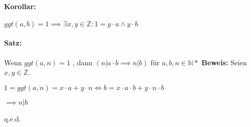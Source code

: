 \documentclass[12pt]{scrreprt}
\newcommand{\corollary}[1]{\paragraph{Korollar:} #1\newline}
\newcommand{\theorem}[1]{\paragraph{Satz:} #1\newline}
\newenvironment{proof}
    {\textbf{Beweis:}\newline\indent}
    {\begin{flushright}q.e.d.\end{flushright}}
\begin{document}
                    \corollary{$ ggt(a, b) = 1 \implies \exists x, y \in \mathbb{Z} : 1 = y \cdot a \land y \cdot b $}

                    \theorem{Wenn $ ggt(a, n) = 1 $ , dann $ (n \vert a \cdot b \implies n \vert b) $ für $ a, b, n \in \mathbb{N*} $}
                    \begin{proof}
                        Seien $ x, y \in \mathbb{Z} $.

                        $ 1 = ggt(a, n) = x \cdot a + y \cdot n \iff b = x \cdot a \cdot b + y \cdot n \cdot b $

                        $ \implies n \vert b $
                    \end{proof}
\end{document}
